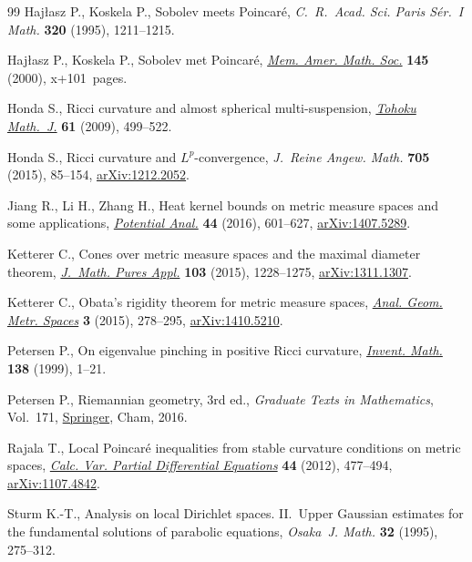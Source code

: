 \begin{thebibliography}{99}
Haj{\l}asz P., Koskela P., Sobolev meets {P}oincar\'e, \textit{C.~R.~Acad. Sci.
 Paris S\'er.~I Math.} \textbf{320} (1995), 1211--1215.

Haj{\l}asz P., Koskela P., Sobolev met {P}oincar\'e, \href{https://doi.org/10.1090/memo/0688}{\textit{Mem. Amer. Math.
 Soc.}} \textbf{145} (2000), x+101~pages.

Honda S., Ricci curvature and almost spherical multi-suspension, \href{https://doi.org/10.2748/tmj/1264084497}{\textit{Tohoku
 Math.~J.}} \textbf{61} (2009), 499--522.

Honda S., Ricci curvature and {$L^p$}-convergence, \textit{J.~Reine Angew.
 Math.} \textbf{705} (2015), 85--154, \href{https://arxiv.org/abs/1212.2052}{arXiv:1212.2052}.

Jiang R., Li H., Zhang H., Heat kernel bounds on metric measure spaces and some
 applications, \href{https://doi.org/10.1007/s11118-015-9521-2}{\textit{Potential Anal.}} \textbf{44} (2016), 601--627,
 \href{https://arxiv.org/abs/1407.5289}{arXiv:1407.5289}.

Ketterer C., Cones over metric measure spaces and the maximal diameter theorem,
 \href{https://doi.org/10.1016/j.matpur.2014.10.011}{\textit{J.~Math. Pures Appl.}} \textbf{103} (2015), 1228--1275,
 \href{https://arxiv.org/abs/1311.1307}{arXiv:1311.1307}.

Ketterer C., Obata's rigidity theorem for metric measure spaces, \href{https://doi.org/10.1515/agms-2015-0016}{\textit{Anal.
 Geom. Metr. Spaces}} \textbf{3} (2015), 278--295, \href{https://arxiv.org/abs/1410.5210}{arXiv:1410.5210}.

Petersen P., On eigenvalue pinching in positive {R}icci curvature,
 \href{https://doi.org/10.1007/s002220050339}{\textit{Invent. Math.}} \textbf{138} (1999), 1--21.

Petersen P., Riemannian geometry, 3rd ed., \textit{Graduate Texts in Mathematics}, Vol.~171, \href{https://doi.org/10.1007/978-3-319-26654-1}{Springer}, Cham, 2016.

Rajala T., Local {P}oincar\'e inequalities from stable curvature conditions on
 metric spaces, \href{https://doi.org/10.1007/s00526-011-0442-7}{\textit{Calc. Var. Partial Differential Equations}} \textbf{44}
 (2012), 477--494, \href{https://arxiv.org/abs/1107.4842}{arXiv:1107.4842}.

Sturm K.-T., Analysis on local {D}irichlet spaces. {II}.~{U}pper {G}aussian
 estimates for the fundamental solutions of parabolic equations,
 \textit{Osaka~J. Math.} \textbf{32} (1995), 275--312.


\end{thebibliography}

